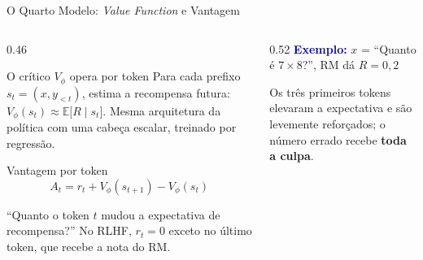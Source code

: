 \documentclass[aspectratio=169, xcolor=dvipsnames]{beamer}
\begin{document}
  \begin{frame}{O Quarto Modelo: \textit{Value Function} e Vantagem}
    \small
    \begin{columns}[T]
      \begin{column}{0.46\textwidth}
        \begin{block}{O crítico $V_\phi$ opera por token}
          Para cada prefixo $s_t = (x, y_{<t})$, estima a recompensa futura: $V_\phi(s_t) \approx \mathbb{E}\big[R \mid s_t\big]$.
          Mesma arquitetura da política com uma cabeça escalar, treinado por regressão.
        \end{block}
        \begin{block}{Vantagem por token}
          \vspace{-0.6em}
          \[
            A_t = r_t + V_\phi(s_{t+1}) - V_\phi(s_t)
          \]
          \vspace{-1.1em}

          ``Quanto o token $t$ mudou a expectativa de recompensa?''
          No RLHF, $r_t = 0$ exceto no último token, que recebe a nota do RM.
        \end{block}
      \end{column}
      \begin{column}{0.52\textwidth}
        \textcolor{DarkBlue}{\textbf{Exemplo:}} $x$ = ``Quanto é $7\times 8$?'', RM dá $R = 0{,}2$
        \vspace{0.2em}


        \vspace{0.3em}
        Os três primeiros tokens elevaram a expectativa e são levemente reforçados; o número errado recebe \textbf{toda a culpa}.


\end{column}
\end{columns}
\end{frame}
\end{document}

